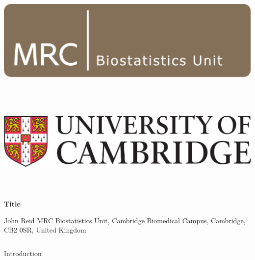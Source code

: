\documentclass[t, final]{beamer}
\begin{document}
\begin{frame}{}

%
\begin{block}{
  \vspace{24pt}

  \includegraphics[height=150pt]{BSU}
  \hfill
  \includegraphics[height=150pt]{UniCam}

  \vspace{24pt}
}
  \vspace{24pt}

  \fontsize{82pt}{82pt}\selectfont \textcolor{mrcblue}{\textbf{Title}}

  \vspace{24pt}

  \fontsize{36pt}{36pt}\selectfont
  \textcolor{mrcblue}{
    John Reid
    \hspace{30pt}
    MRC Biostatistics Unit,
    Cambridge Biomedical Campus,
    Cambridge, CB2 0SR,
    United Kingdom}
\end{block}


%


%
\begin{columns}[t]
\begin{column}{.32\linewidth}
\begin{block}{Introduction}
  \blindtext
\end{block}


\end{column}
\end{columns}
\end{frame}
\end{document}
